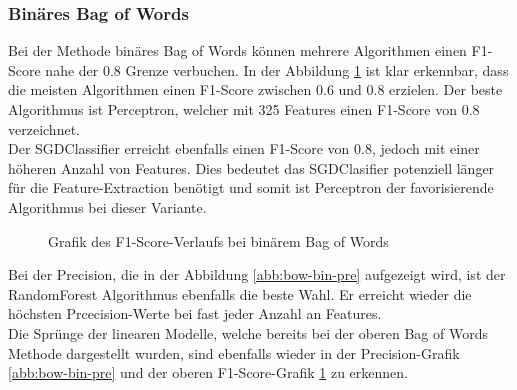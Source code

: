 \subsubsection{Binäres Bag of Words}
Bei der Methode \glqq binäres Bag of Words\grqq{} können mehrere Algorithmen einen F1-Score nahe der 0.8 Grenze verbuchen.
In der Abbildung \cref{abb:bow-bin-f1} ist klar erkennbar, dass die meisten Algorithmen einen F1-Score zwischen 0.6 und 0.8 erzielen.
Der beste Algorithmus ist Perceptron, welcher mit 325 Features einen F1-Score von 0.8 verzeichnet.\\
Der SGDClassifier erreicht ebenfalls einen F1-Score von 0.8, jedoch mit einer höheren Anzahl von Features.
Dies bedeutet das SGDClasifier potenziell länger für die Feature-Extraction benötigt und somit ist Perceptron der favorisierende Algorithmus bei dieser Variante.\\
\begin{figure}[H]	
	\setlength{\fboxsep}{0.3pt} 
	\setlength{\fboxrule}{0.3pt} 
	\caption{Grafik des F1-Score-Verlaufs bei binärem Bag of Words}
	\label{abb:bow-bin-f1}
\end{figure}
Bei der Precision, die in der Abbildung \cref{abb:bow-bin-pre} aufgezeigt wird, ist der RandomForest Algorithmus ebenfalls die beste Wahl.
Er erreicht wieder die höchsten Prcecision-Werte bei fast jeder Anzahl an Features.\\
Die Sprünge der linearen Modelle, welche bereits bei der oberen \glqq Bag of Words\grqq{} Methode dargestellt wurden, sind ebenfalls wieder in der Precision-Grafik \cref{abb:bow-bin-pre} und der oberen F1-Score-Grafik \cref{abb:bow-bin-f1} zu erkennen.
